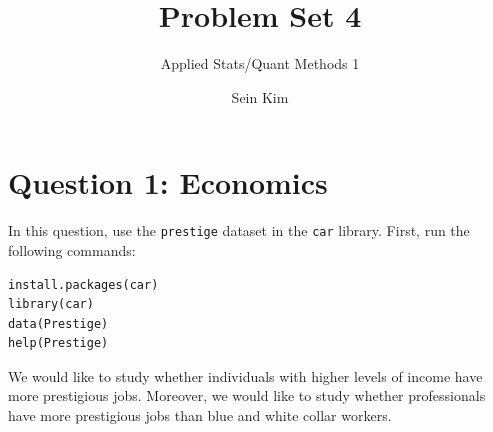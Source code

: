 \documentclass[12pt,letterpaper]{article}
\title{Problem Set 4}
\date{Sein Kim}
\author{Applied Stats/Quant Methods 1}
\begin{document}
	\maketitle


	\vspace{.5cm}
\section*{Question 1: Economics}
\vspace{.25cm}
\noindent 	
In this question, use the \texttt{prestige} dataset in the \texttt{car} library. First, run the following commands:

\begin{verbatim}
install.packages(car)
library(car)
data(Prestige)
help(Prestige)
\end{verbatim} 


\noindent We would like to study whether individuals with higher levels of income have more prestigious jobs. Moreover, we would like to study whether professionals have more prestigious jobs than blue and white collar workers.
\end{document}
